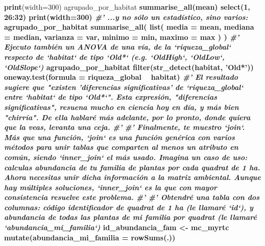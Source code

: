 \documentclass[11pt,]{article}
\newenvironment{Shaded}{\begin{snugshade}}{\end{snugshade}}
\newcommand{\KeywordTok}[1]{\textcolor[rgb]{0.13,0.29,0.53}{\textbf{#1}}}
\newcommand{\DataTypeTok}[1]{\textcolor[rgb]{0.13,0.29,0.53}{#1}}
\newcommand{\DecValTok}[1]{\textcolor[rgb]{0.00,0.00,0.81}{#1}}
\newcommand{\StringTok}[1]{\textcolor[rgb]{0.31,0.60,0.02}{#1}}
\newcommand{\CommentTok}[1]{\textcolor[rgb]{0.56,0.35,0.01}{\textit{#1}}}
\newcommand{\OperatorTok}[1]{\textcolor[rgb]{0.81,0.36,0.00}{\textbf{#1}}}
\newcommand{\NormalTok}[1]{#1}
\begin{document}
\begin{Shaded}
\begin{Highlighting}[]
{{{{{{{{{{{{{{{{{{{{{{{{{{{{{{{{{{{{{{{{{{{{{{{{{{{{{{{{{{{{{{\StringTok{  }\KeywordTok{print}\NormalTok{(}\DataTypeTok{width=}\DecValTok{300}\NormalTok{)}
\NormalTok{agrupado_por_habitat }\OperatorTok{%
\StringTok{  }\KeywordTok{summarise_all}\NormalTok{(mean) }\OperatorTok{%
\StringTok{  }\KeywordTok{select}\NormalTok{(}\DecValTok{1}\NormalTok{, }\DecValTok{26}\OperatorTok{:}\DecValTok{32}\NormalTok{) }\OperatorTok{%
\StringTok{  }\KeywordTok{print}\NormalTok{(}\DataTypeTok{width=}\DecValTok{300}\NormalTok{)}
\CommentTok{#' ...y no sólo un estadístico, sino varios:}
\NormalTok{agrupado_por_habitat }\OperatorTok{%
\StringTok{  }\KeywordTok{summarise_all}\NormalTok{(}
    \KeywordTok{list}\NormalTok{(}
      \DataTypeTok{media =}\NormalTok{ mean,}
      \DataTypeTok{mediana =}\NormalTok{ median,}
      \DataTypeTok{varianza =}\NormalTok{ var,}
      \DataTypeTok{minimo =}\NormalTok{ min,}
      \DataTypeTok{maximo =}\NormalTok{ max}
\NormalTok{    )}
\NormalTok{  )}
\CommentTok{#' Ejecuto también un ANOVA de una vía, de la `riqueza_global` respecto de `habitat` de tipo `Old*` (e.g. `OldHigh`, `OldLow`, `OldSlope`)}
\NormalTok{agrupado_por_habitat }\OperatorTok{%
\StringTok{  }\KeywordTok{filter}\NormalTok{(}\KeywordTok{str_detect}\NormalTok{(habitat, }\StringTok{'Old*'}\NormalTok{)) }\OperatorTok{%
\StringTok{  }\KeywordTok{oneway.test}\NormalTok{(}\DataTypeTok{formula =}\NormalTok{ riqueza_global }\OperatorTok{~}\StringTok{ }\NormalTok{habitat)}
\CommentTok{#' El resultado sugiere que "existen 'diferencias significativas' de `riqueza_global` entre `habitat` de tipo `Old*`". Esta expresión, "diferencias significativas", resuena mucho en ciencia hoy en día, y más bien "chirría". De ella hablaré más adelante, por lo pronto, donde quiera que la veas, levanta una ceja.}
\CommentTok{#' }
\CommentTok{#' Finalmente, te muestro `join`. Más que una función, `join` es una función genérica con varios métodos para unir tablas que comparten al menos un atributo en común, siendo `inner_join` el más usado. Imagina un caso de uso: calculas abundancia de tu familia de plantas por cada quadrat de 1 ha. Ahora necesitas unir dicha información a la matriz ambiental. Aunque hay múltiples soluciones, `inner_join` es la que con mayor consistencia resuelve este problema.}
\CommentTok{#' }
\CommentTok{#' Obtendré una tabla con dos columnas: código identificador de quadrat de 1 ha (le llamaré `id`), y abundancia de todas las plantas de mi familia por quadrat (le llamaré `abundancia_mi_familia`)}
\NormalTok{id_abundancia_fam <-}\StringTok{ }\NormalTok{mc_myrtc }\OperatorTok{%
\StringTok{  }\KeywordTok{mutate}\NormalTok{(}\DataTypeTok{abundancia_mi_familia =} \KeywordTok{rowSums}\NormalTok{(.)) }\OperatorTok{%
}}}}}}}}}}}}}}}}}}}}}}}}}}}}}}}}}}}}}}}}}}}}}}}}}}}}}}}}}}}}}}}}}}}}}}
\end{Highlighting}
\end{Shaded}
\end{document}
